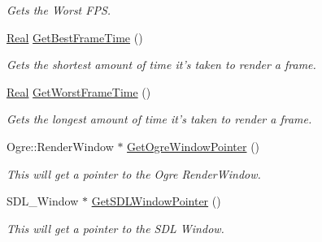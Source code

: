\begin{DoxyCompactItemize}
\begin{DoxyCompactList}\small\item\em Gets the Worst FPS. \item\end{DoxyCompactList}\item 
\hyperlink{namespacephys_af7eb897198d265b8e868f45240230d5f}{Real} \hyperlink{classphys_1_1GameWindow_a128723e10c8a3ab778b30da38d351fc4}{GetBestFrameTime} ()
\begin{DoxyCompactList}\small\item\em Gets the shortest amount of time it's taken to render a frame. \item\end{DoxyCompactList}\item 
\hyperlink{namespacephys_af7eb897198d265b8e868f45240230d5f}{Real} \hyperlink{classphys_1_1GameWindow_a3e8bcceb201cc2e319fba6b6bf34ee93}{GetWorstFrameTime} ()
\begin{DoxyCompactList}\small\item\em Gets the longest amount of time it's taken to render a frame. \item\end{DoxyCompactList}\item 
Ogre::RenderWindow $\ast$ \hyperlink{classphys_1_1GameWindow_ad94dbdf063bd5dd9a285a7803928aede}{GetOgreWindowPointer} ()
\begin{DoxyCompactList}\small\item\em This will get a pointer to the Ogre RenderWindow. \item\end{DoxyCompactList}\item 
SDL\_\-Window $\ast$ \hyperlink{classphys_1_1GameWindow_aefddde0d6790e9e71687310b0328b043}{GetSDLWindowPointer} ()
\begin{DoxyCompactList}\small\item\em This will get a pointer to the SDL Window. \item\end{DoxyCompactList}\end{DoxyCompactItemize}
